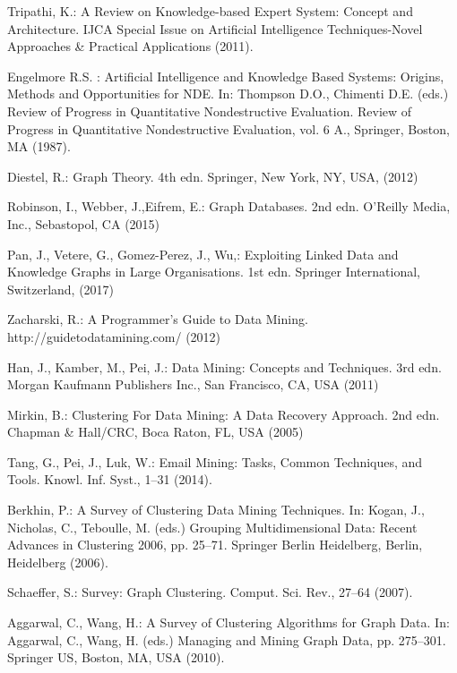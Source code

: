 \documentclass[runningheads]{llncs}
\begin{document}
\begin{thebibliography}{8}
Tripathi, K.: A Review on Knowledge-based Expert System: Concept and Architecture. IJCA Special Issue on Artificial Intelligence Techniques-Novel Approaches \& Practical Applications (2011). 

Engelmore R.S.  : Artificial Intelligence and Knowledge Based Systems: Origins, Methods and Opportunities for NDE. In: Thompson D.O., Chimenti D.E. (eds.) Review of Progress in Quantitative Nondestructive Evaluation. Review of Progress in Quantitative Nondestructive Evaluation, vol. 6 A., 
Springer, Boston, MA (1987). 

Diestel, R.: Graph Theory. 4th edn. Springer, New York, NY, USA, (2012)

Robinson, I., Webber, J.,Eifrem, E.: Graph Databases. 2nd edn. O'Reilly Media, Inc., Sebastopol, CA (2015)

Pan, J., Vetere, G., Gomez-Perez, J., Wu,: Exploiting Linked Data and Knowledge Graphs in Large Organisations. 1st edn. Springer International, Switzerland, (2017)

Zacharski, R.: A Programmer's Guide to Data Mining. http://guidetodatamining.com/ (2012)

Han, J., Kamber, M., Pei, J.: Data Mining: Concepts and Techniques. 3rd edn. Morgan Kaufmann Publishers Inc.,
San Francisco, CA, USA (2011)

Mirkin, B.: Clustering For Data Mining: A Data Recovery Approach. 2nd edn. Chapman \& Hall/CRC,
Boca Raton, FL, USA (2005)

Tang, G., Pei, J., Luk, W.: Email Mining: Tasks, Common Techniques, and Tools. Knowl. Inf. Syst., 1--31 (2014). 

Berkhin, P.: A Survey of Clustering Data Mining Techniques. In: Kogan, J., Nicholas, C., Teboulle, M. (eds.) Grouping Multidimensional Data: Recent Advances in Clustering 2006, pp. 25--71.
Springer Berlin Heidelberg, Berlin, Heidelberg (2006). 

Schaeffer, S.: Survey: Graph Clustering. Comput. Sci. Rev., 27--64 (2007). 

Aggarwal, C., Wang, H.: A Survey of Clustering Algorithms for Graph Data. In: Aggarwal, C., Wang, H. (eds.) Managing and Mining Graph Data, pp. 275--301.
Springer US, Boston, MA, USA (2010). 


\end{thebibliography}
\end{document}
